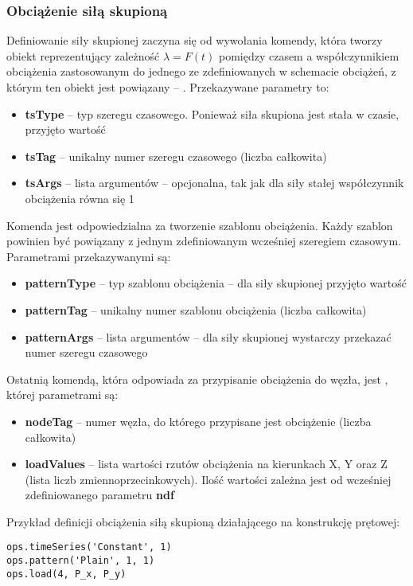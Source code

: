\subsubsection*{Obciążenie siłą skupioną}

Definiowanie siły skupionej zaczyna się od wywołania komendy, która tworzy obiekt reprezentujący zależność $\lambda=F(t)$ pomiędzy czasem
a współczynnikiem obciążenia zastosowanym do jednego ze zdefiniowanych w schemacie obciążeń, z którym ten obiekt jest powiązany – .
Przekazywane parametry to:

\begin{itemize}
    \item \textbf{tsType} – typ szeregu czasowego. Ponieważ siła skupiona jest stała w czasie, przyjęto wartość 
    \item \textbf{tsTag} – unikalny numer szeregu czasowego (liczba całkowita)
    \item \textbf{tsArgs} – lista argumentów – opcjonalna, tak jak dla siły stałej współczynnik obciążenia równa się 1
\end{itemize}
Komenda  jest odpowiedzialna za tworzenie szablonu obciążenia.
Każdy szablon powinien być powiązany z jednym zdefiniowanym wcześniej szeregiem czasowym. Parametrami przekazywanymi są:

\begin{itemize}
    \item \textbf{patternType} – typ szablonu obciążenia – dla siły skupionej przyjęto wartość 
    \item \textbf{patternTag} – unikalny numer szablonu obciążenia (liczba całkowita)
    \item \textbf{patternArgs} – lista argumentów – dla siły skupionej wystarczy przekazać numer szeregu czasowego
\end{itemize}
Ostatnią komendą, która odpowiada za przypisanie obciążenia do węzła, jest ,
której parametrami są:

\begin{itemize}
    \item \textbf{nodeTag} – numer węzła, do którego przypisane jest obciążenie (liczba całkowita)
    \item \textbf{loadValues} – lista wartości rzutów obciążenia na kierunkach X, Y oraz Z (lista liczb zmiennoprzecinkowych). Ilość wartości zależna jest od wcześniej zdefiniowanego parametru \textbf{ndf}
\end{itemize}
Przykład definicji obciążenia siłą skupioną działającego na konstrukcję prętowej:
\begin{lstlisting}
ops.timeSeries('Constant', 1)
ops.pattern('Plain', 1, 1)
ops.load(4, P_x, P_y)
\end{lstlisting}

